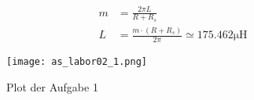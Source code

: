 \begin{equation} \label{eq218}
    \begin{split}
       m &=  \frac{2 \pi L}{R + R_s}\\
       L &= \frac{m \cdot (R+R_s)}{2 \pi} \simeq 175.462 \mathrm{\mu H}
    \end{split}
\end{equation}







\begin{figure}[H]
 \centering
    \texttt{[image: as\_labor02\_1.png]}
 \caption{Plot der Aufgabe 1}
 \label{fig:PlotAufgabe1}
\end{figure}